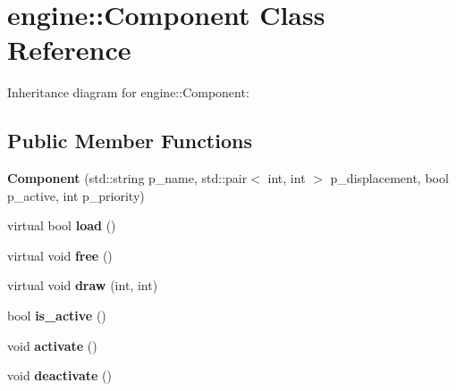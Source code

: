 \hypertarget{classengine_1_1_component}{}\section{engine\+:\+:Component Class Reference}
\label{classengine_1_1_component}


Inheritance diagram for engine\+:\+:Component\+:
\subsection*{Public Member Functions}
\begin{DoxyCompactItemize}
\item 
{\bfseries Component} (std\+::string p\+\_\+name, std\+::pair$<$ int, int $>$ p\+\_\+displacement, bool p\+\_\+active, int p\+\_\+priority)\hypertarget{classengine_1_1_component_a98a00f27d6a6179fcc9120586a3c785d}{}\label{classengine_1_1_component_a98a00f27d6a6179fcc9120586a3c785d}

\item 
virtual bool {\bfseries load} ()\hypertarget{classengine_1_1_component_a2c5fda0dee980614a92bbccad2834772}{}\label{classengine_1_1_component_a2c5fda0dee980614a92bbccad2834772}

\item 
virtual void {\bfseries free} ()\hypertarget{classengine_1_1_component_a932eb4b0cf9d99903e3e6d2508e8fd92}{}\label{classengine_1_1_component_a932eb4b0cf9d99903e3e6d2508e8fd92}

\item 
virtual void {\bfseries draw} (int, int)\hypertarget{classengine_1_1_component_a00aaccbcf3ba091638c1af7e59f32bec}{}\label{classengine_1_1_component_a00aaccbcf3ba091638c1af7e59f32bec}

\item 
bool {\bfseries is\+\_\+active} ()\hypertarget{classengine_1_1_component_ae1a97027b9862ee3e41e6566501d765e}{}\label{classengine_1_1_component_ae1a97027b9862ee3e41e6566501d765e}

\item 
void {\bfseries activate} ()\hypertarget{classengine_1_1_component_aaab29ea159109b4d0f63e9c519be6139}{}\label{classengine_1_1_component_aaab29ea159109b4d0f63e9c519be6139}

\item 
void {\bfseries deactivate} ()\hypertarget{classengine_1_1_component_aa4d1e5e0656ed03f7ff469db25f65053}{}\label{classengine_1_1_component_aa4d1e5e0656ed03f7ff469db25f65053}


\end{DoxyCompactItemize}
